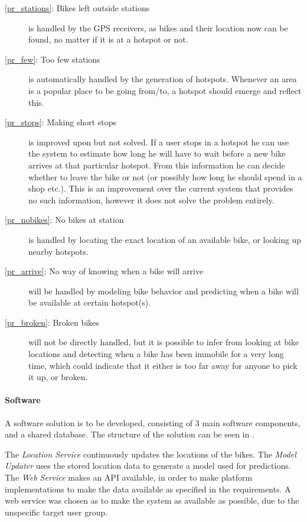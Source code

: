 \begin{description}
\item[\ref{pr_stations}: Bikes left outside stations] is handled by the GPS receivers, as bikes and their location now can be found, no matter if it is at a hotspot or not.

\item[\ref{pr_few}: Too few stations] is automatically handled by the generation of hotspots.
Whenever an area is a popular place to be going from/to, a hotspot should emerge and reflect this.

\item[\ref{pr_stops}: Making short stops] is improved upon but not solved.
If a user stops in a hotspot he can use the system to estimate how long he will have to wait before a new bike arrives at that particular hotspot.
From this information he can decide whether to leave the bike or not (or possibly how long he should spend in a shop etc.).
This is an improvement over the current system that provides no such information, however it does not solve the problem entirely.

\item[\ref{pr_nobikes}: No bikes at station] is handled by locating the exact location of an available bike, or looking up nearby hotspots.

\item[\ref{pr_arrive}: No way of knowing when a bike will arrive] will be handled by modeling bike behavior and predicting when a bike will be available at certain hotspot(s).

\item[\ref{pr_broken}: Broken bikes] will not be directly handled, but it is possible to infer from looking at bike locations and detecting when a bike has been immobile for a very long time, which could indicate that it either is too far away for anyone to pick it up, or broken.
\end{description}

\paragraph{Software}
A software solution is to be developed, consisting of 3 main software components, and a shared database.
The structure of the solution can be seen in .

The \textit{Location Service} continuously updates the locations of the bikes.
The \textit{Model Updater} uses the stored location data to generate a model used for predictions.
The \textit{Web Service} makes an API available, in order to make platform implementations to make the data available as specified in the requirements.
A web service was chosen as to make the system as available as possible, due to the unspecific target user group.

